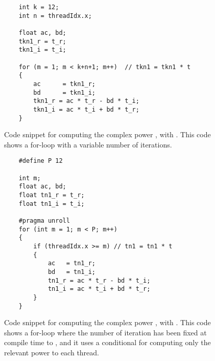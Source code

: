 \begin{figure*}\begin{center}
	\begin{lstlisting}
	int k = 12;
	int n = threadIdx.x;
	    
	float ac, bd;
	tkn1_r = t_r;
	tkn1_i = t_i;
	    
	for (m = 1; m < k+n+1; m++)  // tkn1 = tkn1 * t
	{
	    ac      = tkn1_r;
	    bd      = tkn1_i;
	    tkn1_r = ac * t_r - bd * t_i;
	    tkn1_i = ac * t_i + bd * t_r;
	}

	\end{lstlisting}
\caption{Code snippet for computing the complex power , with . This code shows a for-loop with a variable number of iterations.}
\label{code:loop_divergence}
\end{center}
\end{figure*}


\begin{figure*}\begin{center}
	\begin{lstlisting}
	#define P 12
	
	int m;
	float ac, bd;
	float tn1_r = t_r;
	float tn1_i = t_i;
	
	#pragma unroll
	for (int m = 1; m < P; m++)
	{
	    if (threadIdx.x >= m) // tn1 = tn1 * t
	    {
	        ac   = tn1_r;
	        bd   = tn1_i;
	        tn1_r = ac * t_r - bd * t_i;
	        tn1_i = ac * t_i + bd * t_r;
	    }
	}

	\end{lstlisting}
\caption{Code snippet for computing the complex power , with . This code shows a for-loop where the number of iteration has been fixed at compile time to , and it uses a conditional for computing only the relevant power to each thread.}
\label{code:loop_known_num_iter}
\end{center}
\end{figure*}

